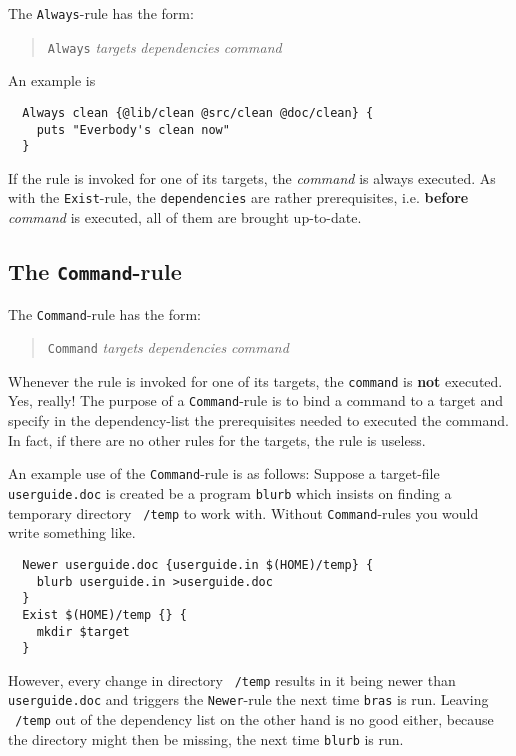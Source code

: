 \documentclass[12pt]{article}
\newcommand{\bras}{\texttt{bras}}
\begin{document}
The \texttt{Always}-rule has the form:

\begin{quote}
  \texttt{Always} \textit{targets} \textit{dependencies} \textit{command}
\end{quote}

An example is
\begin{verbatim}
  Always clean {@lib/clean @src/clean @doc/clean} {
    puts "Everbody's clean now"
  }
\end{verbatim}

If the rule is invoked for one of its targets, the \textit{command} is
always executed. As with the \texttt{Exist}-rule, the
\texttt{dependencies} are rather prerequisites, i.e. \textbf{before}
\textit{command} is executed, all
of them are brought up-to-date.

\subsection{The \texttt{Command}-rule}
\label{SecCommandRule}
The \texttt{Command}-rule has the form:

\begin{quote}
  \texttt{Command} \textit{targets} \textit{dependencies} \textit{command}
\end{quote}

Whenever the rule is invoked for one of its targets, the
\texttt{command} is \textbf{not} executed. Yes, really! The
purpose of a \texttt{Command}-rule is to bind a command to a target
and specify in the dependency-list the prerequisites needed to
executed the command. In fact, if there are no other rules for the
targets, the rule is useless.

An example use of the \texttt{Command}-rule is as follows: Suppose
a target-file \texttt{userguide.doc} is created be a program
\texttt{blurb} which insists on finding a temporary directory
\texttt{~{}/temp} to work with. Without
\texttt{Command}-rules you would write something like.
\begin{verbatim}
  Newer userguide.doc {userguide.in $(HOME)/temp} {
    blurb userguide.in >userguide.doc
  }
  Exist $(HOME)/temp {} {
    mkdir $target
  }
\end{verbatim}

However, every change in directory \texttt{~{}/temp} results in it
being newer than \texttt{userguide.doc} and triggers the
\texttt{Newer}-rule the next time \bras{} is run. Leaving
\texttt{~{}/temp} out of the dependency list on the other hand is no
good either, because the directory might then be missing, the next
time \texttt{blurb} is run.
\end{document}
